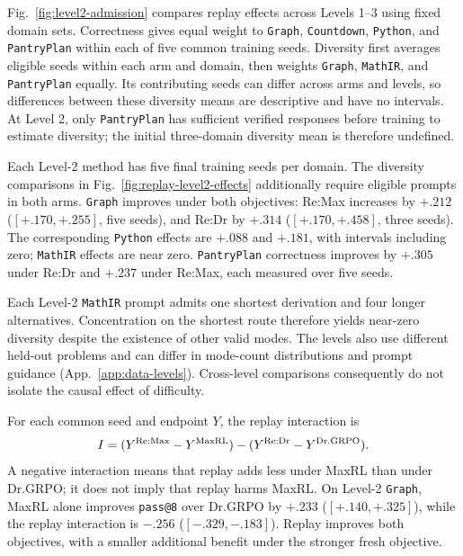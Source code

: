 Fig.~\ref{fig:level2-admission} compares replay effects across Levels 1--3
using fixed domain sets. Correctness gives equal weight to \texttt{Graph},
\texttt{Countdown}, \texttt{Python}, and \texttt{PantryPlan} within each of
five common training seeds. Diversity first averages eligible seeds within
each arm and domain, then weights \texttt{Graph}, \texttt{MathIR}, and
\texttt{PantryPlan} equally. Its contributing seeds can differ across arms
and levels, so differences between these diversity means are descriptive
and have no intervals. At Level 2, only \texttt{PantryPlan} has sufficient
verified responses before training to estimate diversity; the initial
three-domain diversity mean is therefore undefined.

Each Level-2 method has five final training seeds per domain. The diversity
comparisons in Fig.~\ref{fig:replay-level2-effects} additionally require
eligible prompts in both arms. \texttt{Graph} improves under both objectives:
Re:Max increases \pmd{} by $+.212$ ($[+.170,+.255]$, five seeds), and
Re:Dr by $+.314$ ($[+.170,+.458]$, three seeds). The corresponding
\texttt{Python} effects are $+.088$ and $+.181$, with intervals including
zero; \texttt{MathIR} effects are near zero. \texttt{PantryPlan}
correctness improves by $+.305$ under Re:Dr and $+.237$ under Re:Max,
each measured over five seeds.

Each Level-2 \texttt{MathIR} prompt admits one shortest derivation and four
longer alternatives. Concentration on the shortest route therefore yields
near-zero diversity despite the existence of other valid modes. The levels
also use different held-out problems and can differ in mode-count
distributions and prompt guidance (App.~\ref{app:data-levels}). Cross-level
comparisons consequently do not isolate the causal effect of difficulty.

For each common seed and endpoint $Y$, the replay interaction is
\[
 I=(Y^{\rm Re:Max}-Y^{\rm MaxRL})
    -(Y^{\rm Re:Dr}-Y^{\rm Dr.GRPO}).
\]
A negative interaction means that replay adds less under MaxRL than under
Dr.GRPO; it does not imply that replay harms MaxRL. On Level-2
\texttt{Graph}, MaxRL alone improves \texttt{pass@8} over Dr.GRPO by
$+.233$ ($[+.140,+.325]$), while the replay interaction is $-.256$
($[-.329,-.183]$). Replay improves both objectives, with a smaller
additional benefit under the stronger fresh objective.


